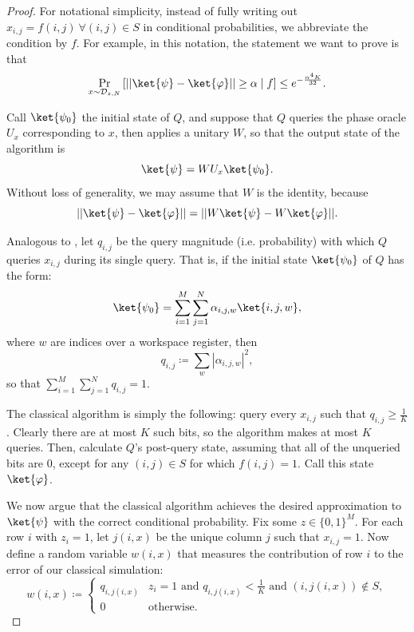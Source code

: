 \documentclass[10pt,a4paper]{article}
\begin{document}
\begin{proof}
For notational simplicity, instead of fully writing out $x_{i,j} = f(i, j)\ \forall (i, j) \in S$ in conditional probabilities, we abbreviate the condition by $f$. For example, in this notation, the statement we want to prove is that
\[
\Pr_{x \sim \mathcal{D}_{z,N}} \left[|| \ket{\psi} - \ket{\varphi}|| \ge \alpha \mid f\right] \le e^{-\frac{\alpha^4 K}{32}}.
\]

Call $\ket{\psi_0}$ the initial state of $Q$, and suppose that $Q$ queries the phase oracle $U_x$ corresponding to $x$, then applies a unitary $W$, so that the output state of the algorithm is
\[
\ket{\psi} = W U_x \ket{\psi_0}.
\]
Without loss of generality, we may assume that $W$ is the identity, because
\[
|| \ket{\psi} - \ket{\varphi}|| = || W\ket{\psi} - W\ket{\varphi}||.
\]

Analogous to , let $q_{i,j}$ be the query magnitude (i.e. probability) with which $Q$ queries $x_{i,j}$ during its single query. That is, if the initial state $\ket{\psi_0}$ of $Q$ has the form:
\[
\ket{\psi_0} = \sum_{i=1}^M \sum_{j=1}^N \alpha_{i,j,w} \ket{i,j,w},
\]
where $w$ are indices over a workspace register, then
\[
q_{i,j} \coloneqq \sum_w |\alpha_{i,j,w}|^2,
\]
so that $\sum_{i=1}^M \sum_{j=1}^N q_{i,j} = 1$.

The classical algorithm is simply the following: query every $x_{i,j}$ such that $q_{i,j} \ge \frac{1}{K}$. Clearly there are at most $K$ such bits, so the algorithm makes at most $K$ queries. Then, calculate $Q$'s post-query state, assuming that all of the unqueried bits are $0$, except for any $(i, j) \in S$ for which $f(i, j) = 1$. Call this state $\ket{\varphi}$.

We now argue that the classical algorithm achieves the desired approximation to $\ket{\psi}$ with the correct conditional probability. Fix some $z \in \{0,1\}^M$. For each row $i$ with $z_i = 1$, let $j(i, x)$ be the unique column $j$ such that $x_{i,j} = 1$. Now define a random variable $w(i,x)$ that measures the contribution of row $i$ to the error of our classical simulation:
\begin{equation}
\label{eq:wij_def_2}
w(i,x) \coloneqq \begin{cases}
q_{i,j(i,x)} & z_i = 1 \text{ and } q_{i,j(i,x)} < \frac{1}{K} \text{ and } (i, j(i, x)) \not \in S,\\
0 & \text{otherwise}.
\end{cases}
\end{equation}


\end{proof}
\end{document}
